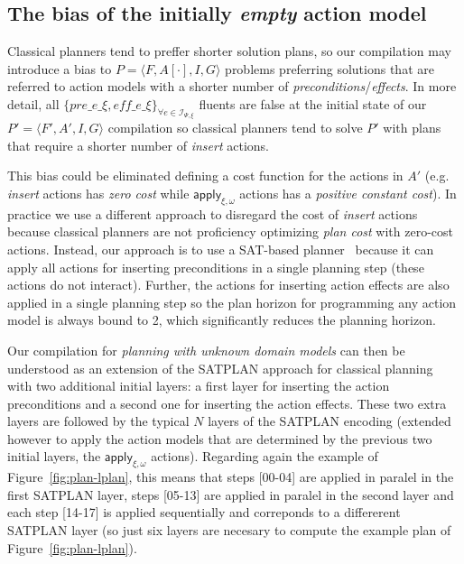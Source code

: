 \documentclass[letterpaper]{article} %
\newcommand{\tup}[1]{{\langle #1 \rangle}}
\begin{document}
\subsection{The bias of the initially {\em empty} action model}
Classical planners tend to preffer shorter solution plans, so our compilation may introduce a bias to $P=\tup{F,A[\cdot],I,G}$ problems preferring solutions that are referred to action models with a shorter number of {\em preconditions}/{\em effects}. In more detail, all $\{pre\_e\_\xi, eff\_e\_\xi\}_{\forall e\in{\mathcal I}_{\Psi,\xi}}$ fluents are false at the initial state of our $P'=\tup{F',A',I,G}$ compilation so classical planners tend to solve $P'$ with plans that require a shorter number of {\em insert} actions.

This bias could be eliminated defining a cost function for the actions in $A'$ (e.g. {\em insert} actions has {\em zero cost} while $\mathsf{apply_{\xi,\omega}}$ actions has a {\em positive constant cost}). In practice we use a different approach to disregard the cost of {\em insert} actions because classical planners are not proficiency optimizing {\em plan cost} with zero-cost actions. Instead, our approach is to use a SAT-based planner~\cite{rintanen2014madagascar} because it can apply all actions for inserting preconditions in a single planning step (these actions do not interact). Further, the actions for inserting action effects are also applied in a single planning step so the plan horizon for programming any action model is always bound to 2, which significantly reduces the planning horizon.

Our compilation for {\em planning with unknown domain models} can then be understood as an extension of the SATPLAN approach for classical planning~\cite{kautz1992planning} with two additional initial layers: a first layer for inserting the action preconditions and a second one for inserting the action effects. These two extra layers are followed by the typical $N$ layers of the SATPLAN encoding (extended however to apply the action models that are determined by the previous two initial layers, the $\mathsf{apply_{\xi,\omega}}$ actions). Regarding again the example of Figure~\ref{fig:plan-lplan}, this means that steps [00-04] are applied in paralel in the first SATPLAN layer, steps [05-13] are applied in paralel in the second layer and each step [14-17] is applied sequentially and correponds to a differerent SATPLAN layer (so just six layers are necesary to compute the example plan of Figure~\ref{fig:plan-lplan}).
\end{document}
